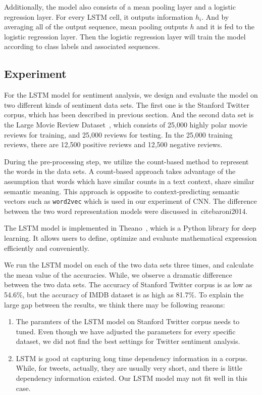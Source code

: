 Additionally, the model also consists of a mean pooling layer and a logistic regression layer. For every LSTM cell, it outputs information $h_i$. And by averaging all of the output sequence, mean pooling outputs $h$ and it is fed to the logistic regression layer. Then the logistic regression layer will train the model according to class labels and associated sequences.

\subsection{Experiment}
For the LSTM model for sentiment analysis, we design and evaluate the model on two different kinds of sentiment data sets. The first one is the Stanford Twitter corpus, which has been described in previous section. And the second data set is the Large Movie Review Dataset~\cite{maas2011}, which consists of 25,000 highly polar movie reviews for training, and 25,000 reviews for testing. In the 25,000 training reviews, there are 12,500 positive reviews and 12,500 negative reviews.

During the pre-processing step, we utilize the count-based method to represent the words in the data sets. A count-based approach takes advantage of the assumption that words which have similar counts in a text context, share similar semantic meaning. This approach is opposite to context-predicting semantic vectors such as {\tt word2vec} which is used in our experiment of CNN. The difference between the two word representation models were discussed in~cite{baroni2014}. 

The LSTM model is implemented in Theano~\cite{bastien2012, bergstra2010}, which is a Python library for deep learning. It allows users to define, optimize and evaluate mathematical expression efficiently and conveniently. 

We run the LSTM model on each of the two data sets three times, and calculate the mean value of the accuracies. While, we observe a dramatic difference between the two data sets. The accuracy of Stanford Twitter corpus is as low as 54.6\%, but the accuracy of IMDB dataset is as high as 81.7\%. To explain the large gap between the results, we think there may be following reasons:

\begin{enumerate}
\item The paramters of the LSTM model on Stanford Twitter corpus needs to tuned. Even though we have adjusted the parameters for every specific dataset, we did not find the best settings for Twitter sentiment analysis.
\item LSTM is good at capturing long time dependency information in a corpus. While, for tweets, actually, they are usually very short, and there is little dependency information existed. Our LSTM model may not fit well in this case.
\end{enumerate}




